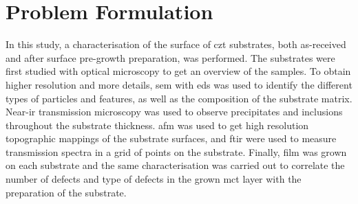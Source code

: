 \section{Problem Formulation}%

In this study, a characterisation of the surface of \ac{czt} substrates, both as-received and after surface pre-growth preparation, was performed. The substrates were first studied with optical microscopy to get an overview of the samples. To obtain higher resolution and more details, \ac{sem} with \ac{eds} was used to identify the different types of particles and features, as well as the composition of the substrate matrix. Near-\ac{ir} transmission microscopy was used to observe precipitates and inclusions throughout the substrate thickness. \Ac{afm} was used to get high resolution topographic mappings of the substrate surfaces, and \ac{ftir} were used to measure transmission spectra in a grid of points on the substrate. Finally,  film was grown on each substrate and the same characterisation was carried out to correlate the number of defects and type of defects in the grown \ac{mct} layer with the preparation of the substrate.

